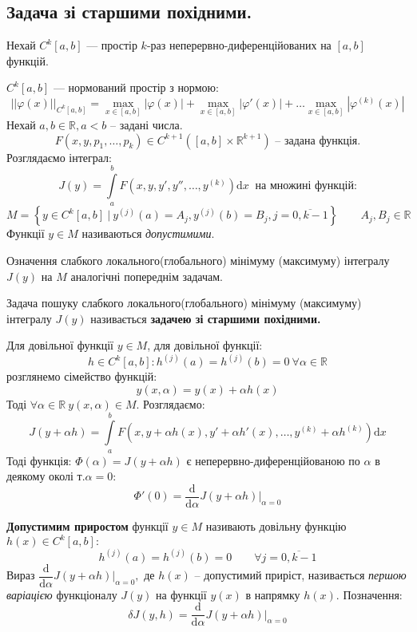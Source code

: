 \section{}
\subsection{Задача зі старшими похідними.}
Нехай $C^k [a,b]$ --- простір $k$-раз неперервно-диференційованих на $[a,b]$ функцій.\par

$C^k[a,b]$ --- нормований простір з нормою:
$$
||\varphi(x)||_{C^k[a,b]} =
\max\limits_{x\in[a,b]}{ |\varphi(x)|} +
 \max\limits_{x\in[a,b]}{|\varphi'(x)|} + \dots
  \max\limits_{x\in[a,b]}{|\varphi^{(k)}(x)|}
$$
Нехай $a,b \in \mathbb{R}, a<b$ -- задані числа.
$$
F(x,y,p_1, \dots, p_k) \in C^{k+1}\left( [a,b] \times \mathbb{R}^{k+1} \right) \text{ -- задана функція.}
$$
Розглядаємо інтеграл:
$$
J(y) =  \int\limits_{a}^{ b}{
F(x, y, y' , y'', \dots , y^{(k)}) \mathrm{d} x
}\  \text{ на множині функцій:}
$$
$$
M = \left\lbrace
y\in C^{k}[a,b] \ \bigg| \  y^{(j)} (a) = A_j , y^{(j)} (b) = B_j , j=\overline{0, k-1}
 \right\rbrace \qquad A_j ,  B_j \in \mathbb{R}
$$
Функції $y \in M$ називаються \textit{допустимими}.
\begin{defo}
Означення слабкого локального(глобального) мінімуму (максимуму) інтегралу $J(y)$ на $M$ аналогічні попереднім задачам.
\end{defo}
\begin{defo}
 Задача пошуку слабкого  локального(глобального) мінімуму (максимуму) інтегралу $J(y)$ називається \textbf{задачею зі старшими похідними.}
\end{defo}
Для довільної функції $y\in M$, для довільної функції:
$$
h \in C^{k}[a,b] : h^{(j)}(a) = h^{(j)}(b) = 0 \ \forall \alpha \in \mathbb{R}
$$
розглянемо сімейство функцій:
$$
y(x, \alpha) = y(x) + \alpha h(x)
$$
Тоді $\forall \alpha \in \mathbb{R} \  y(x, \alpha) \in M$. Розглядаємо:
$$
J(y + \alpha h) =  \int\limits_{a }^{b}{F(x, y + \alpha h(x), y' + \alpha h' (x), \dots , y^{(k)} + \alpha h^{(k)}) \mathrm{d} x}
$$
Тоді функція: $\Phi (\alpha) = J(y + \alpha h)$ є неперервно-диференційованою по $\alpha$ в деякому околі т.$\alpha = 0$:
$$
\Phi'(0) = \frac{\mathrm{d}}{\mathrm{d} \alpha} J(y + \alpha h)\bigg|_{\alpha = 0}
$$
\begin{defo}
 \textbf{Допустимим приростом} функції $y\in M$ називають довільну функцію $h(x) \in C^k[a,b]:$
 $$
 h^{(j)} (a) = h^{(j)} (b) = 0 \qquad \forall j = \overline{0, k-1}
 $$
 Вираз $ \dfrac{\mathrm{d}}{\mathrm{d} \alpha} J(y + \alpha h) \bigg|_{\alpha = 0},$ де $h(x)$ -- допустимий приріст, називається \textit{першою варіацією} функціоналу $J(y)$ на функції $y(x)$ в напрямку $h(x)$.
 Позначення:
 $$
 \delta J(y, h) = \frac{\mathrm{d}}{\mathrm{d} \alpha} J (y + \alpha h) \bigg|_{\alpha = 0}
 $$

\end{defo}
